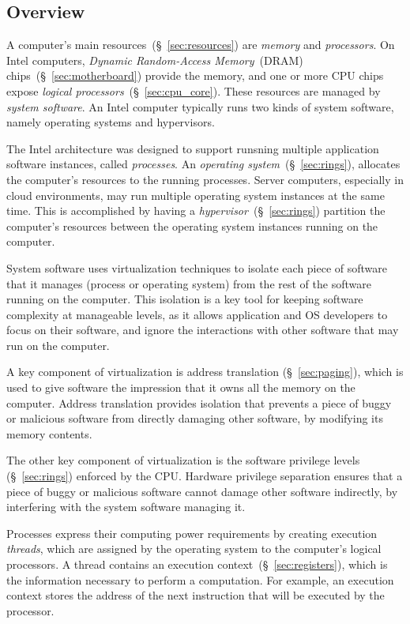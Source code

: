 \subsection{Overview}
\label{sec:background_overview}

A computer's main resources~(\S~\ref{sec:resources}) are \textit{memory} and
\textit{processors}. On Intel computers, \textit{Dynamic Random-Access
Memory}~(DRAM) chips~(\S~\ref{sec:motherboard}) provide the memory, and one or
more CPU chips expose \textit{logical processors}~(\S~\ref{sec:cpu_core}).
These resources are managed by \textit{system software}. An Intel computer
typically runs two kinds of system software, namely operating systems and
hypervisors.

The Intel architecture was designed to support runsning multiple application
software instances, called \textit{processes}. An
\textit{operating system}~(\S~\ref{sec:rings}), allocates the computer's
resources to the running processes. Server computers, especially in cloud
environments, may run multiple operating system instances at the same time.
This is accomplished by having a \textit{hypervisor}~(\S~\ref{sec:rings})
partition the computer's resources between the operating system instances
running on the computer.

System software uses virtualization techniques to isolate each piece of
software that it manages (process or operating system) from the rest of the
software running on the computer. This isolation is a key tool for keeping
software complexity at manageable levels, as it allows application and OS
developers to focus on their software, and ignore the interactions with other
software that may run on the computer.

A key component of virtualization is address translation (\S~\ref{sec:paging}),
which is used to give software the impression that it owns all the memory on
the computer. Address translation provides isolation that prevents a piece of
buggy or malicious software from directly damaging other software, by modifying
its memory contents.

The other key component of virtualization is the software privilege levels
(\S~\ref{sec:rings}) enforced by the CPU. Hardware privilege separation ensures
that a piece of buggy or malicious software cannot damage other software
indirectly, by interfering with the system software managing it.

Processes express their computing power requirements by creating execution
\textit{threads}, which are assigned by the operating system to the computer's
logical processors. A thread contains an execution
context~(\S~\ref{sec:registers}), which is the information necessary to
perform a computation. For example, an execution context stores the address of
the next instruction that will be executed by the processor.

